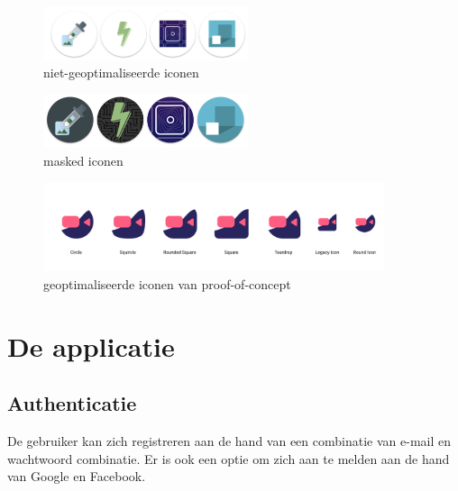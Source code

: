 		\begin{figure}[H]
			\centering
			\includegraphics[width=60mm]{./img/traditionalIcons}{}
			\caption{niet-geoptimaliseerde iconen}
		\end{figure}
		\begin{figure}[H]
			\centering
			\includegraphics[width=60mm]{./img/maskedicons}{}
			\caption{masked iconen}
		\end{figure}
		\begin{figure}[H]
			\centering
			\includegraphics[width=100mm]{./img/iconPWA.png}{}
			\caption{geoptimaliseerde iconen van proof-of-concept}
		\end{figure}


\section{De applicatie}
	\subsection{Authenticatie}
		De gebruiker kan zich registreren aan de hand van een combinatie van e-mail en wachtwoord combinatie. Er is ook een optie om zich aan te melden aan de hand van Google en Facebook.
		
